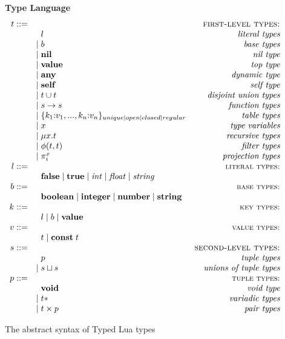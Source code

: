 \begin{figure}[!ht]
\textbf{Type Language}\\
\dstart
$$
\begin{array}{rlr}
t ::= & & \textsc{first-level types:}\\
& \;\; l & \textit{literal types}\\
& | \; b & \textit{base types}\\
& | \; \mathbf{nil} & \textit{nil type}\\
& | \; \mathbf{value} & \textit{top type}\\
& | \; \mathbf{any} & \textit{dynamic type}\\
& | \; \mathbf{self} & \textit{self type}\\
& | \; t \cup t & \textit{disjoint union types}\\
& | \; s \rightarrow s & \textit{function types}\\
& | \; \{k_{1}{:}v_{1}, ..., k_{n}{:}v_{n}\}_{unique|open|closed|regular} & \textit{table types}\\
& | \; x & \textit{type variables}\\
& | \; \mu x.t & \textit{recursive types}\\
& | \; \phi(t,t) & \textit{filter types}\\
& | \; \pi_{i}^{x} & \textit{projection types}\\
l ::= & & \textsc{{\small literal types:}}\\
& \;\; \mathbf{false} \; | \; \mathbf{true} \; | \; {\it int} \; | \; {\it float} \; | \; {\it string} &\\
b ::= & & \textsc{{\small base types:}}\\
& \;\; \mathbf{boolean} \; | \; \mathbf{integer} \; | \; \mathbf{number} \; | \; \mathbf{string} &\\
k ::= & & \textsc{{\small key types:}}\\
& \;\; l \; | \; b \; | \; \mathbf{value} &\\
v ::= & & \textsc{{\small value types:}}\\
& \;\; t \; | \; \mathbf{const} \; t &\\ 
s ::= & & \textsc{second-level types:}\\
& \;\; p & \textit{tuple types}\\
& | \; s \sqcup s & \textit{unions of tuple types}\\
p ::= & & \textsc{{\small tuple types:}}\\
& \;\; \mathbf{void} & \textit{void type}\\
& | \; t* & \textit{variadic types}\\
& | \; t \times p & \textit{pair types}
\end{array}
$$
\dend
\caption{The abstract syntax of Typed Lua types}
\label{fig:typelang}
\end{figure}

